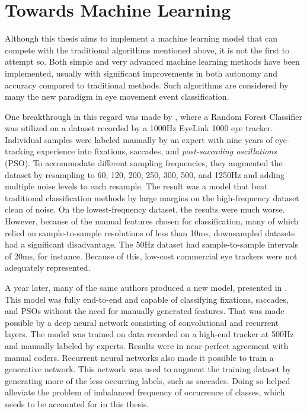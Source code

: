 \newpage
\section{Towards Machine Learning} \label{sec:pw_TowardsMachineLearning}

Although this thesis aims to implement a machine learning model that can compete with the traditional algorithms mentioned above, it is not the first to attempt so. Both simple and very advanced machine learning methods have been implemented, usually with significant improvements in both autonomy and accuracy compared to traditional methods. Such algorithms are considered by many the new paradigm in eye movement event classification.

One breakthrough in this regard was made by \cite{zemblys2017}, where a Random Forest Classifier was utilized on a dataset recorded by a 1000Hz EyeLink 1000 eye tracker. Individual samples were labeled manually by an expert with nine years of eye-tracking experience into fixations, saccades, and \textit{post-saccading oscillations} (PSO). To accommodate different sampling frequencies, they augmented the dataset by resampling to 60, 120, 200, 250, 300, 500, and 1250Hz and adding multiple noise levels to each resample. The result was a model that beat traditional classification methods by large margins on the high-frequency dataset clean of noise. On the lowest-frequency dataset, the results were much worse. However, because of the manual features chosen for classification, many of which relied on sample-to-sample resolutions of less than 10ms, downsampled datasets had a significant disadvantage. The 50Hz dataset had sample-to-sample intervals of 20ms, for instance. Because of this, low-cost commercial eye trackers were not adequately represented.

A year later, many of the same authors produced a new model, presented in \cite{zemblys2018}. This model was fully end-to-end and capable of classifying fixations, saccades, and PSOs without the need for manually generated features. That was made possible by a deep neural network consisting of convolutional and recurrent layers. The model was trained on data recorded on a high-end tracker at 500Hz and manually labeled by experts. Results were in near-perfect agreement with manual coders. Recurrent neural networks also made it possible to train a generative network. This network was used to augment the training dataset by generating more of the less occurring labels, such as saccades. Doing so helped alleviate the problem of imbalanced frequency of occurrence of classes, which needs to be accounted for in this thesis.

